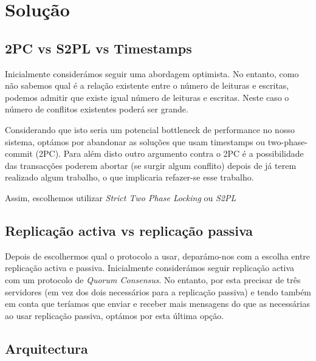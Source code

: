 \section{Solução}

\subsection{2PC vs S2PL vs Timestamps}

Inicialmente considerámos seguir uma abordagem optimista. No entanto, como não sabemos qual é a relação existente entre o número de leituras e escritas, podemos admitir que existe igual número de leituras e escritas. Neste caso o número de conflitos existentes poderá ser grande. 

Considerando que isto seria um potencial bottleneck de performance no nosso sistema, optámos por abandonar as soluções que usam timestamps ou two-phase-commit (2PC). Para além disto outro argumento contra o 2PC é a possibilidade das transacções poderem abortar (se surgir algum conflito) depois de já terem realizado algum trabalho, o que implicaria refazer-se esse trabalho.

Assim, escolhemos utilizar \textit{Strict Two Phase Locking} ou \textit{S2PL}

\subsection{Replicação activa vs replicação passiva}

Depois de escolhermos qual o protocolo a usar, deparámo-nos com a escolha entre replicação activa e passiva. Inicialmente considerámos seguir replicação activa com um protocolo de \textit{Quorum Consensus}. No entanto, por esta precisar de três servidores (em vez dos dois necessários para a replicação passiva) e tendo também em conta que teríamos que enviar e receber mais mensagens do que as necessárias ao usar replicação passiva, optámos por esta última opção.

\subsection{Arquitectura}